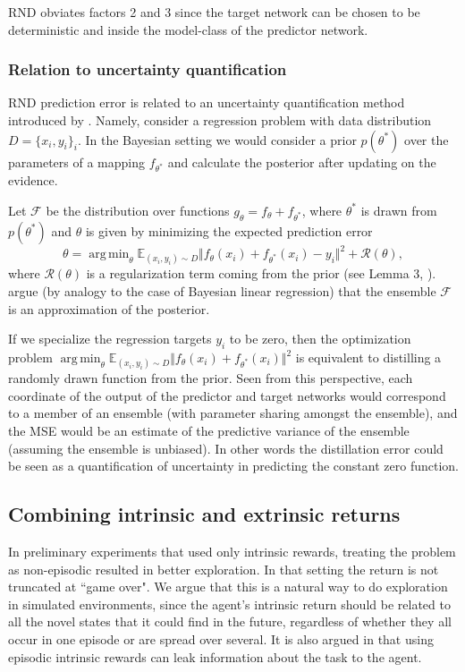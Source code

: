 \documentclass{article} \usepackage[dvipsnames]{xcolor}
\DeclareMathOperator*{\argmin}{arg\,min}
\begin{document}
RND obviates factors 2 and 3 since the target network can be chosen to be deterministic and inside the model-class of the predictor network.

\subsubsection{Relation to uncertainty quantification}
RND prediction error is related to an uncertainty quantification method introduced by \cite{osband2018randomized}. Namely, consider a regression problem with data distribution $D = \{x_i, y_i \}_i$. In the Bayesian setting we would consider a prior $p(\theta^*)$ over the parameters of a mapping $f_{\theta^*}$ and calculate the posterior after updating on the evidence. 

Let $\mathcal{F}$ be the distribution over functions $g_\theta=f_\theta+f_{\theta^*}$, where $\theta^*$ is drawn from $p(\theta^*)$ and $\theta$ is given by minimizing the expected prediction error 
\begin{equation}
\theta = \argmin_{\theta} \mathbb{E}_{(x_i,y_i)\sim D}\Vert f_{\theta}(x_i)+f_{\theta^*}(x_i)-y_i\Vert ^2 + \mathcal{R}(\theta),
\end{equation}
where $\mathcal{R}(\theta)$ is a regularization term coming from the prior (see Lemma 3, \cite{osband2018randomized}).
\citet{osband2018randomized} argue (by analogy to the case of Bayesian linear regression) that the ensemble $\mathcal{F}$ is an approximation of the posterior.

If we specialize the regression targets $y_i$ to be zero, then the optimization problem $\argmin_{\theta} \mathbb{E}_{(x_i,y_i)\sim D}\Vert f_{\theta}(x_i)+f_{\theta^*}(x_i)\Vert ^2$ is equivalent to distilling a randomly drawn function from the prior. Seen from this perspective, each coordinate of the output of the predictor and target networks would correspond to a member of an ensemble (with parameter sharing amongst the ensemble), and the MSE would be an estimate of the predictive variance of the ensemble (assuming the ensemble is unbiased). In other words the distillation error could be seen as a quantification of uncertainty in predicting the constant zero function.

\subsection{Combining intrinsic and extrinsic returns}
\label{sec:methods_two_heads}
In preliminary experiments that used only intrinsic rewards, treating the problem as non-episodic resulted in better exploration. In that setting the return is not truncated at ``game over". We argue that this is a natural way to do exploration in simulated environments, since the agent's intrinsic return should be related to all the novel states that it could find in the future, regardless of whether they all occur in one episode or are spread over several. It is also argued in \citep{burda18largescale} that using episodic intrinsic rewards can leak information about the task to the agent.
\end{document}
